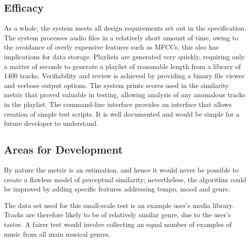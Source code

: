 \subsection{Efficacy}
As a whole, the system meets all design requirements set out in the specification. The system processes audio files in a relatively short amount of time, owing to the avoidance of overly expensive features such as MFCCs, this also has implications for data storage. Playlists are generated very quickly, requiring only a matter of seconds to generate a playlist of reasonable length from a library of 1400 tracks. Verifiability and review is achieved by providing a binary file viewer and verbose output options. The system prints scores used in the similarity metric that proved valuable in testing, allowing analysis of any anomalous tracks in the playlist. The command-line interface provides an interface that allows creation of simple test scripts. It is well documented and would be simple for a future developer to understand.
\subsection{Areas for Development}
By nature the metric is an estimation, and hence it would never be possible to create a flawless model of perceptual similarity; nevertheless, the algorithm could be improved by adding specific features addressing tempo, mood and genre.

The data set used for this small-scale test is an example user's media library. Tracks are therefore likely to be of relatively similar genre, due to the user's tastes. A fairer test would involve collecting an equal number of examples of music from all main musical genres.
